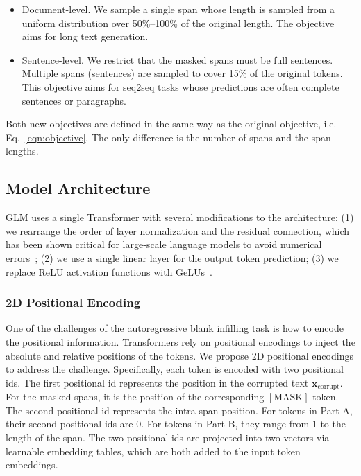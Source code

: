 \begin{itemize}
    \item Document-level. We sample a single span whose length is sampled from a uniform distribution over 50\%--100\% of the original length. The objective aims for long text generation.

    \item Sentence-level. We restrict that the masked spans must be full sentences. Multiple spans (sentences) are sampled to cover 15\% of the original tokens. This objective aims for seq2seq tasks whose predictions are often complete sentences or paragraphs. 
\end{itemize}

Both new objectives are defined in the same way as the original objective, i.e. Eq.~\ref{eqn:objective}. The only difference is the number of spans and the span lengths.

\subsection{Model Architecture} GLM uses a single Transformer with several modifications to the architecture: (1) we rearrange the order of layer normalization and the residual connection, which has been shown critical for large-scale language models to avoid numerical errors~\cite{Megatron-LM}; (2) we use a single linear layer for the output token prediction; (3) we replace ReLU activation functions with GeLUs~\cite{GeLU:HendrycksG16}.

\subsubsection{2D Positional Encoding} One of the challenges of the autoregressive blank infilling task is how to encode the positional information. Transformers rely on positional encodings to inject the absolute and relative positions of the tokens. We propose 2D positional encodings to address the challenge. Specifically, each token is encoded with two positional ids. The first positional id represents the position in the corrupted text $\boldsymbol{x}_{\text{corrupt}}$. For the masked spans, it is the position of the corresponding $[\text{MASK}]$ token. The second positional id represents the intra-span position. For tokens in Part A, their second positional ids are $0$. For tokens in Part B, they range from 1 to the length of the span. The two positional ids are projected into two vectors via learnable embedding tables, which are both added to the input token embeddings.

